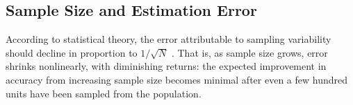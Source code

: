 \documentclass[12pt]{article}
\begin{document}




\subsection{Sample Size and Estimation Error}
According to statistical theory, the error attributable to sampling variability should decline in proportion to $1/\sqrt{N}$ \parencite{cochran_sampling_1977}. That is, as sample size grows, error shrinks nonlinearly, with diminishing returns: the expected improvement in accuracy from increasing sample size becomes minimal after even a few hundred units have been sampled from the population.
\end{document}

